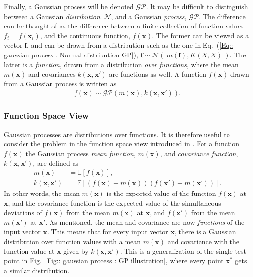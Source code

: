 \documentclass[twoside,english]{uiofysmaster}
\begin{document}
{Finally, a Gaussian process will be denoted $\mathcal{GP}$. It may be difficult to distinguish between a Gaussian \textit{distribution}, $\mathcal{N}$, and a Gaussian \textit{process}, $\mathcal{GP}$. The difference can be thought of as the difference between a finite collection of function values $f_i = f(\textbf{x}_i)$, and the continuous function, $f(\textbf{x})$. The former can be viewed as a vector $\textbf{f}$, and can be drawn from a distribution such as the one in Eq.~(\ref{Eq:: gaussian process : Normal distribution GP}), $\textbf{f} \sim \mathcal{N}(~m(\textbf{f} ), K(X, X)~)$. The latter is a \textit{function}, drawn from a distribution \textit{over functions}, where the mean $m(\textbf{x})$ and covariances $k(\textbf{x}, \textbf{x}')$ are functions as well. A function $f(\textbf{x})$ drawn from a Gaussian process is written as 
\begin{align}
f(\textbf{x}) \sim \mathcal{GP} (m(\textbf{x}), k(\textbf{x}, \textbf{x}')).
\end{align}

\subsubsection{Function Space View}

Gaussian processes are distributions over functions. It is therefore useful to consider the problem in the function space view introduced in \cite{rasmussen2006gaussian}. For a function $f(\textbf{x})$ the Gaussian process \textit{mean function}, $m(\textbf{x})$, and \textit{covariance function}, $k(\textbf{x}, \textbf{x}')$, are defined as
\begin{align}
m(\textbf{x}) &= \mathbb{E}[f(\textbf{x})],\\
k(\textbf{x}, \textbf{x}') &= \mathbb{E} [(f(\textbf{x}) - m(\textbf{x}))(f(\textbf{x}') - m(\textbf{x}'))].
\end{align}
In other words, the mean $m(\textbf{x})$ is the expected value of the function $f(\textbf{x})$ at $\textbf{x}$, and the covariance function is the expected value of the simultaneous deviations of $f(\textbf{x})$ from the mean $m(\textbf{x})$ at $\textbf{x}$, and $f(\textbf{x}')$ from the mean $m(\textbf{x}')$ at $\textbf{x}'$. As mentioned, the mean and covariance are now \textit{functions} of the input vector $\textbf{x}$. This means that for every input vector $\textbf{x}$, there is a Gaussian distribution over function values with a mean $m(\textbf{x})$ and covariance with the function value at $\textbf{x}$ given by $k(\textbf{x}, \textbf{x}')$. This is a generalization of the single test point in Fig.~\ref{Fig:: gaussian process : GP illustration}, where every point $\textbf{x}^*$ gets a similar distribution.

}
\end{document}

